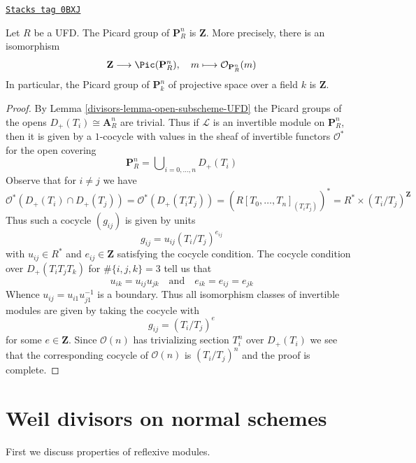 \begin{lemma}
\label{divisors-lemma-Pic-projective-space-UFD}
\href{https://stacks.math.columbia.edu/tag/0BXJ}{\texttt{Stacks tag 0BXJ}}

Let $R$ be a UFD. The Picard group of $\mathbf{P}^n_R$
is $\mathbf{Z}$. More precisely, there is an isomorphism
$$
\mathbf{Z} \longrightarrow \Pic(\mathbf{P}^n_R),\quad
m \longmapsto \mathcal{O}_{\mathbf{P}^n_R}(m)
$$
In particular, the Picard group of $\mathbf{P}^n_k$ of projective
space over a field $k$ is $\mathbf{Z}$.
\end{lemma}

\begin{proof}

By Lemma \ref{divisors-lemma-open-subscheme-UFD} the Picard groups of the opens
$D_+(T_i) \cong \mathbf{A}^n_R$ are trivial.
Thus if $\mathcal{L}$ is an invertible module on
$\mathbf{P}^n_R$, then it is given by a $1$-cocycle with values in
the sheaf of invertible functors $\mathcal{O}^*$ for the open covering
$$
\mathbf{P}^n_R = \bigcup\nolimits_{i = 0, \ldots, n} D_+(T_i)
$$
Observe that for $i \not = j$ we have
$$
\mathcal{O}^*(D_+(T_i) \cap D_+(T_j)) =
\mathcal{O}^*(D_+(T_iT_j)) = \left(R[T_0, \ldots, T_n]_{(T_iT_j)}\right)^* =
R^* \times (T_i/T_j)^\mathbf{Z}
$$
Thus such a cocycle $(g_{ij})$ is given by units
$$
g_{ij} = u_{ij} (T_i/T_j)^{e_{ij}}
$$
with $u_{ij} \in R^*$ and $e_{ij} \in \mathbf{Z}$
satisfying the cocycle condition. The cocycle condition
over $D_+(T_iT_jT_k)$ for $\#\{i, j, k\} = 3$ tell us that
$$
u_{ik} = u_{ij} u_{jk} \quad\text{and}\quad
e_{ik} = e_{ij} = e_{jk}
$$
Whence $u_{ij} = u_{i1} u_{j1}^{-1}$ is a boundary.
Thus all isomorphism classes of invertible modules
are given by taking the cocycle with
$$
g_{ij} = (T_i/T_j)^e
$$
for some $e \in \mathbf{Z}$. Since $\mathcal{O}(n)$ has trivializing
section $T_i^n$ over $D_+(T_i)$ we see that the corresponding
cocycle of $\mathcal{O}(n)$ is $(T_i/T_j)^n$ and the proof is complete.
\end{proof}

\section{Weil divisors on normal schemes}
\label{divisors-section-weil-divisors-normal}
First we discuss properties of reflexive modules.

